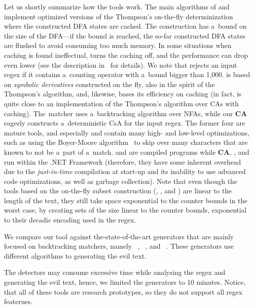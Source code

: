 \documentclass[acmsmall,screen]{acmart}
\begin{document}
Let us shortly summarize how the tools work.
The main algorithms of
\retwo and \grep implement optimized versions of the Thompson's on-the-fly
determinization where the constructed DFA states are cached.
The construction has a~bound on the size of the DFA---if the bound is reached,
the so-far constructed DFA states are flushed to avoid consuming too much
memory.
In some situations when caching is found ineffectual, \retwo turns the caching
off,
and the performance can drop even lower 
 (see the description in~\cite{regexes-in-the-wild} for details).
We note that \retwo rejects an input regex if it contains a~counting
operator with a~bound bigger than 1,000.
%
\srm is based on \emph{symbolic derivatives} constructed on the fly, 
also in the spirit of the Thompson's algorithm, and, likewise, bases its efficiency
on caching
(in fact, \srm is quite close to an implementation of the Thompson's
algorithm over CAs with caching).
The~\dotnet matcher uses a~backtracking algorithm over NFAs, while
%
our \textbf{CA} eagerly constructs a~deterministic CsA for the input regex.
%
The former four are mature tools, and especially \retwo and \grep contain many high- and low-level
optimizations, such as using the Boyer-Moore algorithm~\cite{BoyerM77} to skip
over many characters that are known to not be a~part of a~match.
%
\retwo and \grep are compiled programs while \textbf{CA}, \srm, and
\dotnet run within the .NET Framework (therefore, they have some inherent
overhead due to the \emph{just-in-time} compilation at start-up and its
inability to use advanced code optimizations, as well as 
garbage collection). 
%
Note that even though the tools based on the on-the-fly subset construction (\retwo, \grep, and \srm) are linear to the length of the text, they still take space exponential to the counter bounds in the worst case, by creating sets of the size linear to the counter bounds, exponential to their decadic encoding used in the regex. 


We compare our tool against the-state-of-the-art generators that are mainly focused on backtracking matchers, namely
%
\rex~\cite{rex}, \regexStatic~\cite{regexStatic}, and \rexploiter~\cite{rexploiter}.
%
These generators use different algorithms to generating the evil text.
%

The detectors may consume excessive time while analysing the regex and generating the evil text,
%
hence, we limited the generators to 10 minutes.
% 
Notice, that all of these tools are research prototypes, so they do not support all regex featerues.
\end{document}
